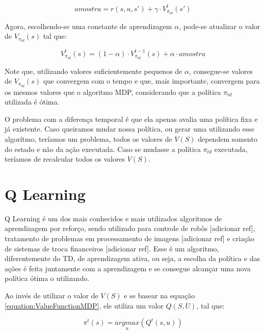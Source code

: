 \begin{equation} \label{equation:AmostraTD}
	amostra = r \left( s, u, s' \right) + \gamma \cdot V_{\pi_{td}}^t \left( s' \right)
\end{equation}

Agora, escolhendo-se uma constante de aprendizagem $ \alpha $, pode-se atualizar o valor de $ V_{\pi_{td}} \left( s \right) $ tal que:

\begin{equation} \label{equation:UpdateValueFunctionTD}
	V_{\pi_{td}}^t \left( s \right) = \left( 1 - \alpha \right) \cdot V_{\pi_{td}}^{t-1} \left( s \right) + \alpha \cdot amostra
\end{equation}

Note que, utilizando valores suficientemente pequenos de $ \alpha $, consegue-se valores de $ V_{\pi_{td}} \left( s \right) $ que convergem com o tempo e que, mais importante, convergem para os mesmos valores que o algoritmo MDP, considerando que a política $ \pi_{td} $ utilizada é ótima.

O problema com a diferença temporal é que ela apenas avalia uma política fixa e já existente. Caso queiramos mudar nossa política, ou gerar uma utilizando esse algorítmo, teríamos um problema, todos os valores de $ V \left( S \right) $ dependem somento do estado e não da ação executada. Caso se mudasse a política $ \pi_{td} $ executada, teríamos de recalcular todos os valores $ V \left( S \right) $.

\section{Q Learning} \label{section:QLearning}

Q Learning é um dos mais conhecidos e mais utilizados algoritmos de aprendizagem por reforço, sendo utilizado para controle de robôs [adicionar ref], tratamento de problemas em processamento de imagens [adicionar ref] e criação de sistemas de troca financeiros [adicionar ref]. Esse é um algoritmo, diferentemente do TD, de aprendizagem ativa, ou seja, a escolha da política e das ações é feita juntamente com a aprendizagem e se consegue alcançar uma nova política ótima o utilizando.

Ao invés de utilizar o valor de $ V \left( S \right) $ e se basear na equação \ref{equation:ValueFunctionMDP}, ele utiliza um valor $ Q \left( S, U \right) $, tal que:

\begin{equation} \label{equation:PolicySelectionQLearning}
    \pi^t \left( s \right) = \underset{u}{argmax} \left( Q^t \left( s, u \right) \right)
\end{equation}

